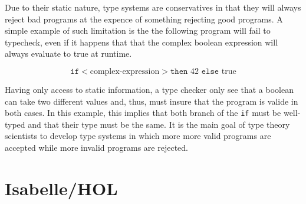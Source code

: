 Due to their static nature, type systems are conservatives in that they will always reject bad
programs at the expence of something rejecting good programs. A simple example of such limitation is
the the following program will fail to typecheck, even if it happens that that the complex boolean
expression will always evaluate to true at runtime.

\begin{displaymath}
  \texttt{if} <\text{complex-expression}> \texttt{then } 42 \texttt{ else } \text{true}
\end{displaymath}

Having only access to static information, a type checker only see that a boolean can take two
different values and, thus, must insure that the program is valide in both cases. In this example,
this implies that both branch of the \texttt{if} must be well-typed and that their type must be the
same. It is the main goal of type theory scientists to develop type systems in which more more valid
programs are accepted while more invalid programs are rejected.

\section{Isabelle/HOL}


